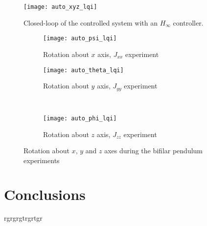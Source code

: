\begin{figure}[h]
	\begin{center}
	\texttt{[image: auto\_xyz\_lqi]}
	\caption{Closed-loop of the controlled system with an $H_{\infty}$ controller.}
	\label{fig:auto_xyz_lqi2}
	\end{center}
	\end{figure}
	
\begin{figure}[H]
\begin{subfigure}{.5\linewidth}
\centering
\texttt{[image: auto\_psi\_lqi]}
\caption{Rotation about $x$ axis, $J_{xx}$ experiment}
\label{fig:auto_psi_lqi2}
\end{subfigure}%
\begin{subfigure}{.5\linewidth}
\centering
\texttt{[image: auto\_theta\_lqi]}
\caption{Rotation about $y$ axis, $J_{yy}$ experiment}
\label{fig:auto_theta_lqi2}
\end{subfigure}\\[1ex]
\begin{subfigure}{\linewidth}
\centering
\texttt{[image: auto\_phi\_lqi]}
\caption{Rotation about $z$ axis, $J_{zz}$ experiment}
\label{fig:auto_psi_lqi2}
\end{subfigure}
\caption{Rotation about $x$, $y$ and $z$ axes during the bifilar pendulum experiments}
\label{fig:auto_lqi2}
\end{figure}

\section{Conclusions}
rgrgrgtrgrtgr